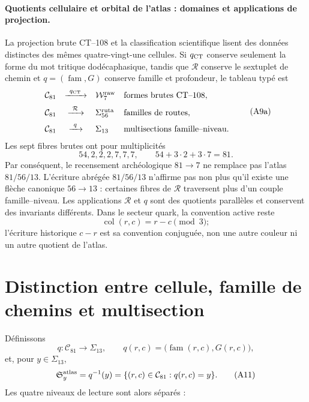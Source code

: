 \paragraph{Quotients cellulaire et orbital de l'atlas : domaines et applications de projection.}
La projection brute CT--108 et la classification scientifique lisent des données
distinctes des mêmes quatre-vingt-une cellules. Si
\(q_{\rm CT}\) conserve seulement la forme du mot tritique
dodécaphasique, tandis que \(\mathcal R\) conserve le sextuplet de chemin et
\(q=(\operatorname{fam},G)\) conserve famille et profondeur, le tableau
typé est
\[
\begin{array}{rcll}
 \mathcal C_{81}
 &\xrightarrow{\ q_{\rm CT}\ }&
 \mathcal W^{\rm raw}_{7}
 & \text{formes brutes CT--108},\\[2mm]
 \mathcal C_{81}
 &\xrightarrow{\ \mathcal R\ }&
 \Sigma^{\rm ruta}_{56}
 & \text{familles de routes},\\[2mm]
 \mathcal C_{81}
 &\xrightarrow{\ q\ }&
 \Sigma_{13}
 & \text{multisections famille--niveau}.
\end{array}
\tag{A9a}\label{eq:dos-cocientes-atlas-rev8}
\]
Les sept fibres brutes ont pour multiplicités
\[
 54,2,2,2,7,7,7,
 \qquad54+3\cdot2+3\cdot7=81.
\]
Par conséquent, le recensement archéologique \(81\to7\) ne remplace pas l'atlas
\(81/56/13\). L'écriture abrégée \(81/56/13\) n'affirme pas non plus qu'il existe
une flèche canonique \(56\to13\) : certaines fibres de \(\mathcal R\) traversent
plus d'un couple famille--niveau. Les applications \(\mathcal R\) et \(q\) sont des
quotients parallèles et conservent des invariants différents. Dans le secteur quark,
la convention active reste
\[
 \operatorname{col}(r,c)=r-c\pmod3;
\]
l'écriture historique \(c-r\) est sa convention conjuguée, non une autre couleur ni
un autre quotient de l'atlas.

\section{Distinction entre cellule, famille de chemins et multisection}

Définissons
\[
 q:\mathcal C_{81}\longrightarrow\Sigma_{13},
 \qquad
 q(r,c)=\bigl(\operatorname{fam}(r,c),G(r,c)\bigr),
 \tag{A10}\label{eq:cociente-trece-multisecciones}
\]
et, pour \(y\in\Sigma_{13}\),
\[
 \mathfrak S_y^{\rm atlas}
 =q^{-1}(y)
 =\{(r,c)\in\mathcal C_{81}:q(r,c)=y\}.
 \tag{A11}\label{eq:multiseccion-atlas-rev6}
\]
Les quatre niveaux de lecture sont alors séparés :


